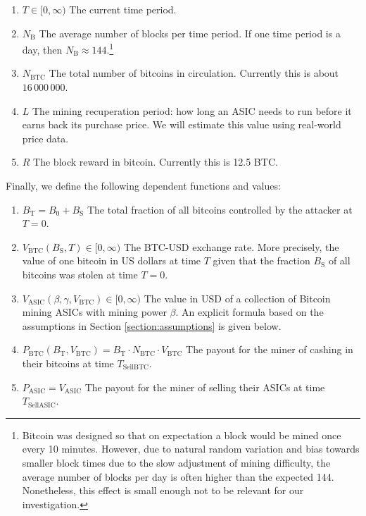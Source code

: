 \documentclass[12pt]{article}
\newcommand*{\Time}{T}
\newcommand*{\ABtcOrig}{{B_0}}
\newcommand*{\ABtcStolen}{{B_{\mathrm{S}}}}
\newcommand*{\ABtcTotal}{{B_{\mathrm{T}}}}
\newcommand*{\NumBtc}{{N_{\mathrm{BTC}}}}
\newcommand*{\BlkReward}{{R}}
\newcommand*{\ExchgRate}{{V_{\mathrm{BTC}}}}
\newcommand*{\AsicValue}{{V_{\mathrm{ASIC}}}}
\newcommand*{\TimeCashOut}{{T_{\mathrm{SellBTC}}}}
\newcommand*{\TimeSellAsics}{{T_{\mathrm{SellASIC}}}}
\newcommand*{\PayoffBtc}{{P_{\mathrm{BTC}}}}
\newcommand*{\PayoffAsic}{{P_{\mathrm{ASIC}}}}
\newcommand*{\BlocksPerPeriod}{{N_{\mathrm{B}}}}
\newenvironment{defs}
  { \begin{enumerate}[labelindent=0pt,labelwidth=2.5in,itemindent=0em,align=parleft,leftmargin=!] }
  { \end{enumerate} }
\begin{document}
\begin{defs}
  \item[{$\Time \in [0, \infty)$}]
    The current time period.
  \item[{$\BlocksPerPeriod$}]
    The average number of blocks per time period. If one time period is a day, then $\BlocksPerPeriod \approx 144$.\cite{blksperday}\footnote{
      Bitcoin was designed so that on expectation a block would be mined once every 10 minutes. However, due to natural random variation and bias towards smaller block times due to the slow adjustment of mining difficulty, the average number of blocks per day is often higher than the expected 144. Nonetheless, this effect is small enough not to be relevant for our investigation.
    }
  \item[{$\NumBtc$}]
    The total number of bitcoins in circulation. Currently this is about $16\,000\,000$.\cite{btcincirc}
  \item[{$L$}]
    The mining recuperation period: how long an ASIC needs to run before it earns back its purchase price. We will estimate this value using real-world price data.
  \item[{$\BlkReward$}]
    The block reward in bitcoin. Currently this is 12.5 BTC.\cite{blkreward}
\end{defs}

Finally, we define the following dependent functions and values:

\begin{defs}
  \item[{$\ABtcTotal
      = \ABtcOrig + \ABtcStolen$}]
    The total fraction of all bitcoins controlled by the attacker at $\Time = 0$.
  \item[{$\ExchgRate(\ABtcStolen, \Time) \in [0, \infty)$}]
    The BTC-USD exchange rate. More precisely, the value of one bitcoin in US
    dollars at time $\Time$ given that the fraction $\ABtcStolen$ of all
    bitcoins was stolen at time $\Time = 0$.
  \item[{$\AsicValue(\beta, \gamma, \ExchgRate) \in [0, \infty)$}]
    The value in USD of a collection of Bitcoin mining ASICs with mining power $\beta$.
    An explicit formula based on the assumptions in Section \ref{section:assumptions} is given below.
  \item[{$\PayoffBtc(\ABtcTotal, \ExchgRate)
      = \ABtcTotal \cdot \NumBtc \cdot \ExchgRate$}]
    The payout for the miner of cashing in their bitcoins at time $\TimeCashOut$.
  \item[{$\PayoffAsic
      = \AsicValue$}]
    The payout for the miner of selling their ASICs at time $\TimeSellAsics$.
\end{defs}
\end{document}
